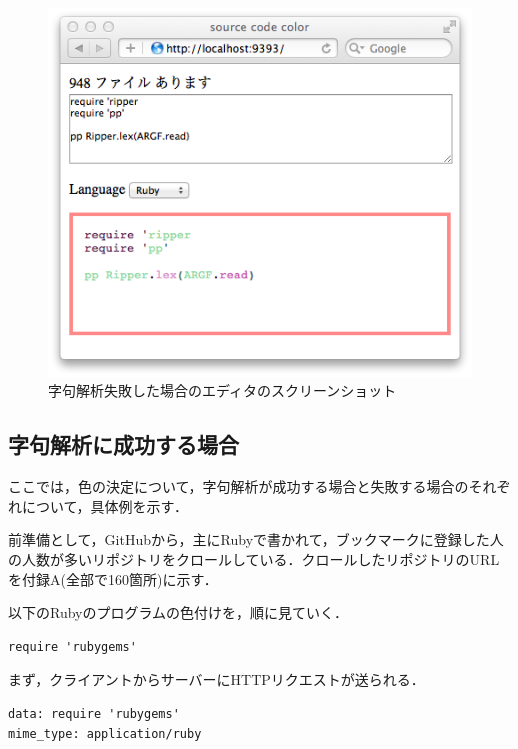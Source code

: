 \documentclass{cs-thesis}
\begin{document}
  \begin{figure}[htbp]
   \centering
   \includegraphics[scale=0.8]{editor-screenshot-example-fail.png}
   \caption{字句解析失敗した場合のエディタのスクリーンショット}
   \label{editor-screenshot-example-fail}
  \end{figure}

  \subsection{字句解析に成功する場合}
  ここでは，色の決定について，字句解析が成功する場合と失敗する場合のそれぞれについて，具体例を示す．

  前準備として，GitHubから，主にRubyで書かれて，ブックマークに登録した人の人数が多いリポジトリをクロールしている．クロールしたリポジトリのURLを付録A(全部で160箇所)に示す．

  以下のRubyのプログラムの色付けを，順に見ていく．

  \begin{framed}
\begin{verbatim}
require 'rubygems'
  \end{verbatim}
\end{framed}

  まず，クライアントからサーバーにHTTPリクエストが送られる．

\begin{framed}
\begin{verbatim}
data: require 'rubygems'
mime_type: application/ruby
\end{verbatim}
\end{framed}
\end{document}
